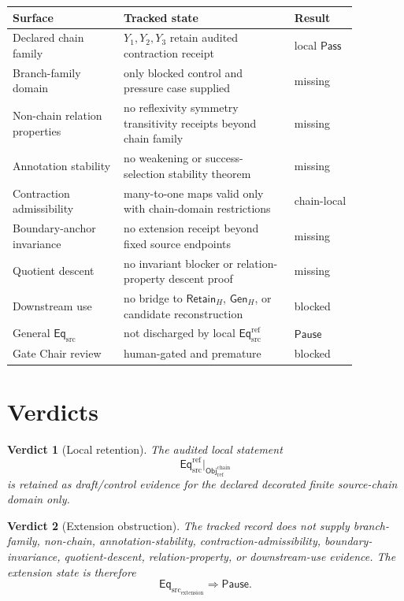 \documentclass[11pt]{article}
\newcommand{\EqSrc}{\mathsf{Eq}_{\mathrm{src}}}
\newcommand{\EqRef}{\mathsf{Eq}_{\mathrm{src}}^{\mathrm{ref}}}
\newcommand{\ObjRef}{\mathsf{Obj}_{\mathrm{ref}}}
\newcommand{\RetainH}{\mathsf{Retain}_{H}}
\newcommand{\GenH}{\mathsf{Gen}_{H}}
\newcommand{\Pass}{\mathsf{Pass}}
\newcommand{\Pause}{\mathsf{Pause}}
\newtheorem{verdict}{Verdict}
\begin{document}
\begin{center}
\begin{tabular}{p{0.28\linewidth}p{0.43\linewidth}p{0.16\linewidth}}
\textbf{Surface} & \textbf{Tracked state} & \textbf{Result} \\
\hline
Declared chain family & \(Y_{1},Y_{2},Y_{3}\) retain audited contraction receipt & local \(\Pass\) \\
Branch-family domain & only blocked control and pressure case supplied & missing \\
Non-chain relation properties & no reflexivity symmetry transitivity receipts beyond chain family & missing \\
Annotation stability & no weakening or success-selection stability theorem & missing \\
Contraction admissibility & many-to-one maps valid only with chain-domain restrictions & chain-local \\
Boundary-anchor invariance & no extension receipt beyond fixed source endpoints & missing \\
Quotient descent & no invariant blocker or relation-property descent proof & missing \\
Downstream use & no bridge to \(\RetainH\), \(\GenH\), or candidate reconstruction & blocked \\
General \(\EqSrc\) & not discharged by local \(\EqRef\) & \(\Pause\) \\
Gate Chair review & human-gated and premature & blocked \\
\end{tabular}
\end{center}

\section{Verdicts}

\begin{verdict}[Local retention]
The audited local statement
\[
    \EqRef\big|_{\ObjRef^{\mathrm{chain}}}
\]
is retained as draft/control evidence for the declared decorated finite
source-chain domain only.
\end{verdict}

\begin{verdict}[Extension obstruction]
The tracked record does not supply branch-family, non-chain,
annotation-stability, contraction-admissibility, boundary-invariance,
quotient-descent, relation-property, or downstream-use evidence. The
extension state is therefore
\[
    \EqSrc_{\mathrm{extension}}\Rightarrow \Pause.
\]
\end{verdict}
\end{document}
